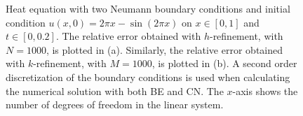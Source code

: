 \begin{figure}
\centering
{}\hspace{0mm}
\hspace{0mm}
\caption{Heat equation with two Neumann boundary conditions and initial condition $u(x,0) = 2\pi x - \sin{(2\pi x)}$ on $x \in [0,1]$ and $t \in [0,0.2]$. The relative error obtained with $h$-refinement, with $N=1000$, is plotted in (a). Similarly, the relative error obtained with $k$-refinement, with $M=1000$, is plotted in (b). A second order discretization of the boundary conditions is used when calculating the numerical solution with both BE and CN. The $x$-axis shows the number of degrees of freedom in the linear system.}
\label{fig:2a_hrefAndKref}
\end{figure}

